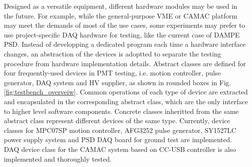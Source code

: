 \documentclass[5p, times]{elsarticle}
\begin{document}
Designed as a versatile equipment, different hardware modules may be used in the future.
For example, while the general-purpose VME or CAMAC platform may meet the demands of most of the use cases, some experiments may prefer to use project-specific DAQ hardware for testing, like the current case of DAMPE PSD.
Instead of developping a dedicated program each time a hardware interface changes, an abstraction of the devices is adoptted to separate the testing procedure from hardware implementation details. 
Abstract classes are defined for four frequently-used devices in PMT testing, i.e. motion controller, pulse generator, DAQ system and HV supplier, as shown in rounded boxes in Fig.\ref{fig:testbench_overveiw}.
Common operations of each type of device are extracted and encapsulated in the corresponding abstract class, which are the only interface to higher level software components.
Concrete classes inheritted from the same abstract class represent different devices of the same type.
Currently, device classes for MPC07SP motion controller, AFG3252 pulse generator, SY1527LC power supply system and PSD DAQ board for ground test are implemented.
DAQ device class for the CAMAC system based on CC-USB controller is also implemented and thoroughly tested.
\end{document}
